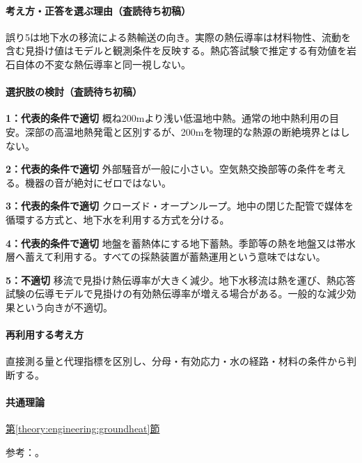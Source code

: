 \paragraph{考え方・正答を選ぶ理由（査読待ち初稿）} 誤り5は地下水の移流による熱輸送の向き。実際の熱伝導率は材料物性、流動を含む見掛け値はモデルと観測条件を反映する。熱応答試験で推定する有効値を岩石自体の不変な熱伝導率と同一視しない。

\paragraph{選択肢の検討（査読待ち初稿）}\mbox{}\par

\noindent\textbf{1：代表的条件で適切} 概ね200mより浅い低温地中熱。通常の地中熱利用の目安。深部の高温地熱発電と区別するが、200mを物理的な熱源の断絶境界とはしない。\par

\noindent\textbf{2：代表的条件で適切} 外部騒音が一般に小さい。空気熱交換部等の条件を考える。機器の音が絶対にゼロではない。\par

\noindent\textbf{3：代表的条件で適切} クローズド・オープンループ。地中の閉じた配管で媒体を循環する方式と、地下水を利用する方式を分ける。\par

\noindent\textbf{4：代表的条件で適切} 地盤を蓄熱体にする地下蓄熱。季節等の熱を地盤又は帯水層へ蓄えて利用する。すべての採熱装置が蓄熱運用という意味ではない。\par

\noindent\textbf{5：不適切} 移流で見掛け熱伝導率が大きく減少。地下水移流は熱を運び、熱応答試験の伝導モデルで見掛けの有効熱伝導率が増える場合がある。一般的な減少効果という向きが不適切。\par

\paragraph{再利用する考え方} 直接測る量と代理指標を区別し、分母・有効応力・水の経路・材料の条件から判断する。

\paragraph{共通理論} \hyperref[theory:engineering:groundheat]{第\ref*{theory:engineering:groundheat}節}

\par 参考：\cite{eng52_groundheat_ref,eng52_heat_advection}。


